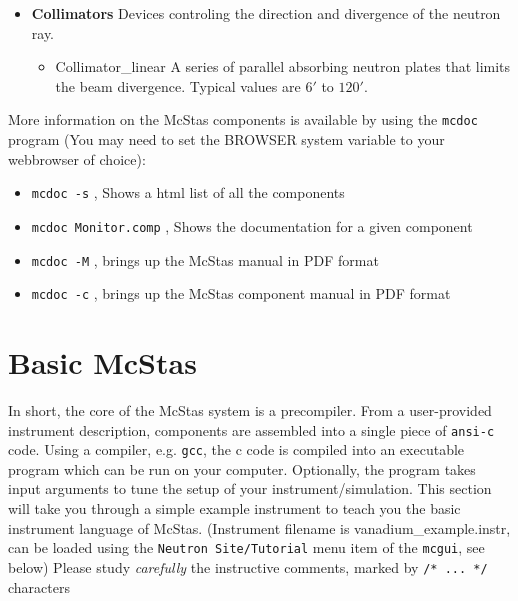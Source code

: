 \begin{itemize}
\begin{itemize}
{        wavelengths of the passing neutron rays. (L is for $\lambda$)}
    \item{Monitor\_nD. General monitor for detecting all sorts of
        physical properties of the neutron ray. In our cases used with
        options }
      \begin{itemize}
      \item{'single' - as PSD\_monitor but only one small square}
      \item{'banana' - as PSD\_monitor but shaped like a curved,
          horizontal band }
      \end{itemize}
    \end{itemize}
  \item{{\bf Collimators}} Devices controling the direction and divergence
   of the neutron ray.
    \begin{itemize}
      \item{Collimator\_linear} A series of parallel absorbing neutron plates
       that limits the beam divergence. 
       Typical values are $6'$ to $120'$.
    \end{itemize}
  \end{itemize}
More information on the McStas components is available by using the
\verb+mcdoc+ program (You may need to set the BROWSER system variable
to your webbrowser of choice):
\begin{itemize}
\item{\verb+mcdoc -s+ , Shows a html list of all the components}
\item{\verb+mcdoc Monitor.comp+ , Shows the documentation for a given component}
\item{\verb+mcdoc -M+ , brings up the McStas manual in PDF format}
\item{\verb+mcdoc -c+ , brings up the McStas component manual in PDF format}
\end{itemize}

\section{Basic McStas}
In short, the core of the McStas system is a precompiler. From a
user-provided instrument description, components are assembled into 
a single piece of \texttt{ansi-c} code. Using a compiler, e.g. 
\texttt{gcc}, the c code is compiled into an executable program 
which can be run on your computer. Optionally, the program takes 
input arguments to tune the setup of your instrument/simulation. 
This section will take you through a simple example instrument 
to teach you the basic instrument language of McStas. (Instrument 
filename is vanadium\_example.instr, can be loaded using the
\verb+Neutron Site/Tutorial+ menu item of the \verb+mcgui+, see below)
Please study \emph{carefully} the instructive comments,
marked by \verb+/* ... */+ characters
    
